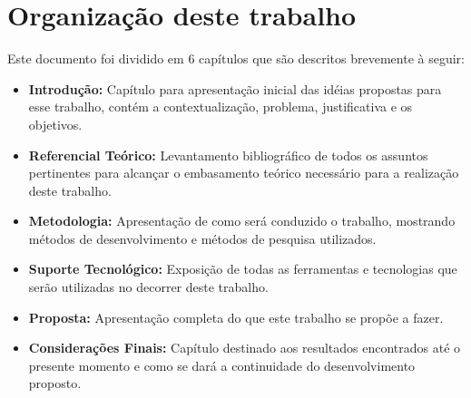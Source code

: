 \section{Organização deste trabalho}

Este documento foi dividido em 6 capítulos que são descritos brevemente à seguir:

\begin{itemize}
	\item \textbf{Introdução:} Capítulo para apresentação inicial das idéias propostas para esse trabalho, contém a contextualização, problema, justificativa e os objetivos.
	\item \textbf{Referencial Teórico:} Levantamento bibliográfico de todos os assuntos pertinentes para alcançar o embasamento teórico necessário para a realização deste trabalho.
	\item \textbf{Metodologia:} Apresentação de como será conduzido o trabalho, mostrando métodos de desenvolvimento e métodos de pesquisa utilizados.
	\item \textbf{Suporte Tecnológico:} Exposição de todas as ferramentas e tecnologias que serão utilizadas no decorrer deste trabalho.
	\item \textbf{Proposta:} Apresentação completa do que este trabalho se propõe a fazer.
	\item \textbf{Considerações Finais:} Capítulo destinado aos resultados encontrados até o presente momento e como se dará a continuidade do desenvolvimento proposto.
\end{itemize}
